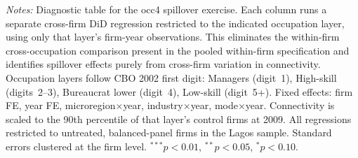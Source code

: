 \begin{table}[H]
\centering
\caption{Univariate cross-firm spillover by occupation layer (diagnostic)}
\label{tab:univariate_occ4_diag}
\begin{minipage}{\linewidth}
\scriptsize\vspace{4pt}
\textit{Notes:} Diagnostic table for the occ4 spillover exercise. Each column runs a separate cross-firm DiD regression restricted to the indicated occupation layer, using only that layer's firm-year observations. This eliminates the within-firm cross-occupation comparison present in the pooled within-firm specification and identifies spillover effects purely from cross-firm variation in connectivity. Occupation layers follow CBO 2002 first digit: Managers (digit~1), High-skill (digits~2--3), Bureaucrat lower (digit~4), Low-skill (digit~5+). Fixed effects: firm FE, year FE, microregion$\times$year, industry$\times$year, mode$\times$year. Connectivity is scaled to the 90th percentile of that layer's control firms at 2009. All regressions restricted to untreated, balanced-panel firms in the Lagos sample. Standard errors clustered at the firm level. $^{***}p<0.01$, $^{**}p<0.05$, $^{*}p<0.10$.
\end{minipage}
\end{table}